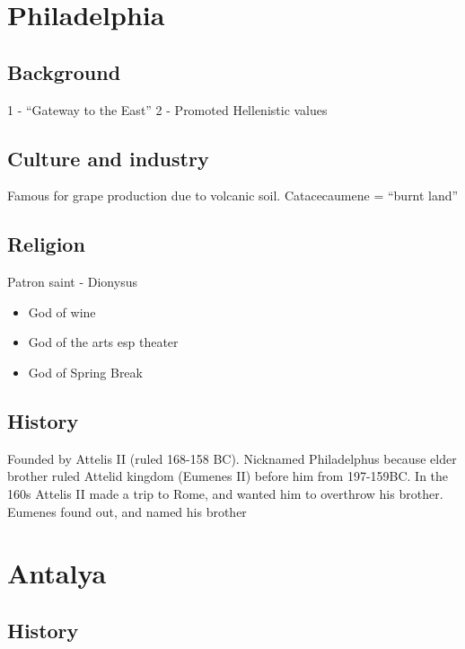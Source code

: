 \documentclass[
]{book}
\providecommand{\tightlist}{%
  \setlength{\itemsep}{0pt}\setlength{\parskip}{0pt}}
\begin{document}
\hypertarget{philadelphia}{%
\chapter{Philadelphia}\label{philadelphia}}

\hypertarget{background}{%
\section{Background}\label{background}}

1 - ``Gateway to the East''
2 - Promoted Hellenistic values

\hypertarget{culture-and-industry}{%
\section{Culture and industry}\label{culture-and-industry}}

Famous for grape production due to volcanic soil. Catacecaumene = ``burnt land''

\hypertarget{religion}{%
\section{Religion}\label{religion}}

Patron saint - Dionysus

\begin{itemize}
\tightlist
\item
  God of wine
\item
  God of the arts esp theater
\item
  God of Spring Break
\end{itemize}

\hypertarget{history-1}{%
\section{History}\label{history-1}}

Founded by Attelis II (ruled 168-158 BC). Nicknamed Philadelphus because elder brother ruled Attelid kingdom (Eumenes II) before him from 197-159BC. In the 160s Attelis II made a trip to Rome, and wanted him to overthrow his brother. Eumenes found out, and named his brother

\hypertarget{antalya}{%
\chapter{Antalya}\label{antalya}}

\hypertarget{history-2}{%
\section{History}\label{history-2}}
\end{document}
